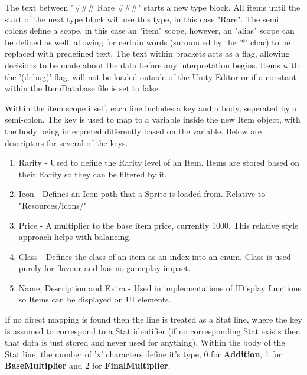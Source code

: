 \documentclass{report}
\begin{document}
The text between "\#\#\# Rare \#\#\#" starts a new type block. All items until the start of the next type block will use this type, in this case "Rare". The semi colons define a scope, in this case an "item" scope, however, an "alias" scope can be defined as well, allowing for certain words (surounded by the '*' char) to be replaced with predefined text. The text within brackets acts as a flag, allowing decisions to be made about the data before any interpretation begins. Items with the '(debug)' flag, will not be loaded outside of the Unity Editor or if a constant within the ItemDatabase file is set to false.

Within the item scope itself, each line includes a key and a body, seperated by a semi-colon. The key is used to map to a variable inside the new Item object, with the body being interpreted differently based on the variable. Below are descriptors for several of the keys.

\begin{enumerate}

	\item Rarity - Used to define the Rarity level of an Item. Items are stored based on their Rarity so they can be filtered by it.

	\item Icon - Defines an Icon path that a Sprite is loaded from. Relative to "Resources/icons/"

	\item Price - A multiplier to the base item price, currently 1000. This relative style approach helps with balancing.

	\item Class - Defines the class of an item as an index into an enum. Class is used purely for flavour and has no gameplay impact.

	\item Name, Description and Extra - Used in implementations of IDisplay functions so Items can be displayed on UI elements.

\end{enumerate}

If no direct mapping is found then the line is treated as a Stat line, where the key is assumed to correspond to a Stat identifier (if no corresponding Stat exists then that data is just stored and never used for anything). Within the body of the Stat line, the number of 'x' characters define it's type, 0 for \textbf{Addition}, 1 for \textbf{BaseMultiplier} and 2 for \textbf{FinalMultiplier}.
\end{document}
